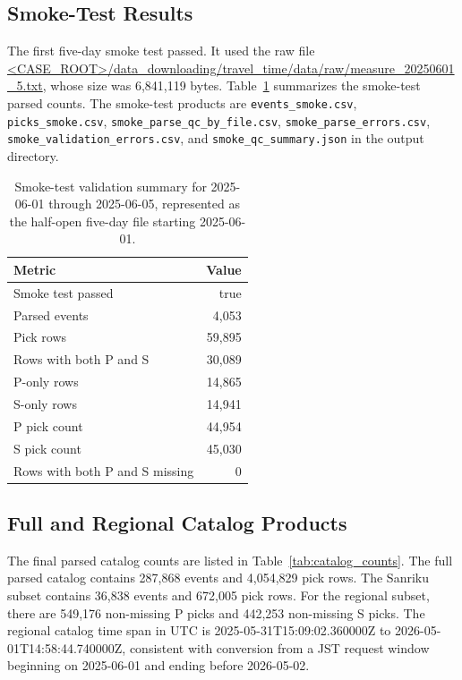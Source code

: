 \documentclass[11pt]{article}
\begin{document}
\subsection{Smoke-Test Results}

The first five-day smoke test passed.  It used the raw file \url{<CASE_ROOT>/data_downloading/travel_time/data/raw/measure_20250601_5.txt}, whose size was 6,841,119 bytes.  Table~\ref{tab:smoke} summarizes the smoke-test parsed counts.  The smoke-test products are \texttt{events\_smoke.csv}, \texttt{picks\_smoke.csv}, \texttt{smoke\_parse\_qc\_by\_file.csv}, \texttt{smoke\_parse\_errors.csv}, \texttt{smoke\_validation\_errors.csv}, and \texttt{smoke\_qc\_summary.json} in the output directory.

\begin{table}[htbp]
\centering
\caption{Smoke-test validation summary for 2025-06-01 through 2025-06-05, represented as the half-open five-day file starting 2025-06-01.}
\label{tab:smoke}
\small
\begin{tabular}{lr}
\toprule
Metric & Value \\
\midrule
Smoke test passed & true \\
Parsed events & 4,053 \\
Pick rows & 59,895 \\
Rows with both P and S & 30,089 \\
P-only rows & 14,865 \\
S-only rows & 14,941 \\
P pick count & 44,954 \\
S pick count & 45,030 \\
Rows with both P and S missing & 0 \\
\bottomrule
\end{tabular}
\end{table}

\subsection{Full and Regional Catalog Products}

The final parsed catalog counts are listed in Table~\ref{tab:catalog_counts}.  The full parsed catalog contains 287,868 events and 4,054,829 pick rows.  The Sanriku subset contains 36,838 events and 672,005 pick rows.  For the regional subset, there are 549,176 non-missing P picks and 442,253 non-missing S picks.  The regional catalog time span in UTC is 2025-05-31T15:09:02.360000Z to 2026-05-01T14:58:44.740000Z, consistent with conversion from a JST request window beginning on 2025-06-01 and ending before 2026-05-02.
\end{document}
